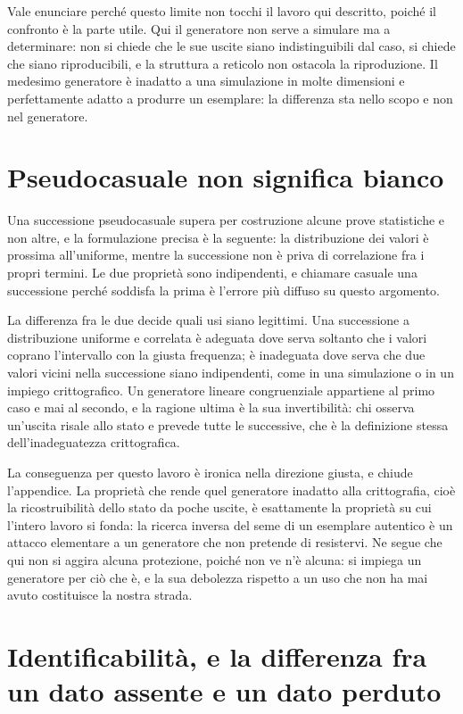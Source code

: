 Vale enunciare perché questo limite non tocchi il lavoro qui descritto, poiché il confronto è la parte utile. Qui il generatore non serve a simulare ma a determinare: non si chiede che le sue uscite siano indistinguibili dal caso, si chiede che siano riproducibili, e la struttura a reticolo non ostacola la riproduzione. Il medesimo generatore è inadatto a una simulazione in molte dimensioni e perfettamente adatto a produrre un esemplare: la differenza sta nello scopo e non nel generatore.

\section{Pseudocasuale non significa bianco}

Una successione pseudocasuale supera per costruzione alcune prove statistiche e non altre, e la formulazione precisa è la seguente: la distribuzione dei valori è prossima all'uniforme, mentre la successione non è priva di correlazione fra i propri termini. Le due proprietà sono indipendenti, e chiamare casuale una successione perché soddisfa la prima è l'errore più diffuso su questo argomento.

La differenza fra le due decide quali usi siano legittimi. Una successione a distribuzione uniforme e correlata è adeguata dove serva soltanto che i valori coprano l'intervallo con la giusta frequenza; è inadeguata dove serva che due valori vicini nella successione siano indipendenti, come in una simulazione o in un impiego crittografico. Un generatore lineare congruenziale appartiene al primo caso e mai al secondo, e la ragione ultima è la sua invertibilità: chi osserva un'uscita risale allo stato e prevede tutte le successive, che è la definizione stessa dell'inadeguatezza crittografica.

La conseguenza per questo lavoro è ironica nella direzione giusta, e chiude l'appendice. La proprietà che rende quel generatore inadatto alla crittografia, cioè la ricostruibilità dello stato da poche uscite, è esattamente la proprietà su cui l'intero lavoro si fonda: la ricerca inversa del seme di un esemplare autentico è un attacco elementare a un generatore che non pretende di resistervi. Ne segue che qui non si aggira alcuna protezione, poiché non ve n'è alcuna: si impiega un generatore per ciò che è, e la sua debolezza rispetto a un uso che non ha mai avuto costituisce la nostra strada.
\section{Identificabilità, e la differenza fra un dato assente e un dato perduto}

